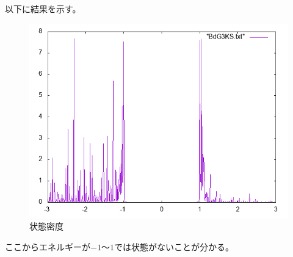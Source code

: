 \documentclass{jarticle}
\begin{document}
以下に結果を示す。
\begin{figure}[H]
	\centering
	\includegraphics[scale=0.7]{BdG3KS1.png}
	\caption{状態密度}
\end{figure}
ここからエネルギーが$-1$〜$1$では状態がないことが分かる。
\end{document}
